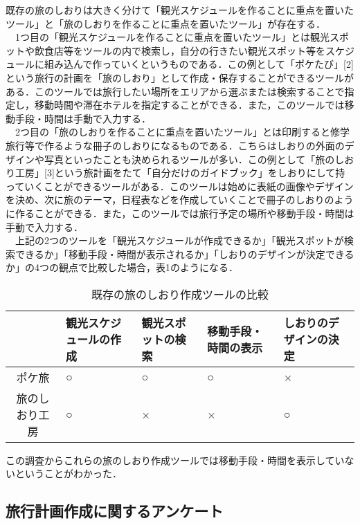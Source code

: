 \documentclass{funthesis}
\begin{document}
既存の旅のしおりは大きく分けて「観光スケジュールを作ることに重点を置いたツール」と「旅のしおりを作ることに重点を置いたツール」が存在する．\\
　1つ目の「観光スケジュールを作ることに重点を置いたツール」とは観光スポットや飲食店等をツールの内で検索し，自分の行きたい観光スポット等をスケジュールに組み込んで作っていくというものである．この例として「ポケたび」[2]という旅行の計画を「旅のしおり」として作成・保存することができるツールがある．このツールでは旅行したい場所をエリアから選ぶまたは検索することで指定し，移動時間や滞在ホテルを指定することができる．また，このツールでは移動手段・時間は手動で入力する．\\
　2つ目の「旅のしおりを作ることに重点を置いたツール」とは印刷すると修学旅行等で作るような冊子のしおりになるものである．こちらはしおりの外面のデザインや写真といったことも決められるツールが多い．この例として「旅のしおり工房」[3]という旅計画をたて「自分だけのガイドブック」をしおりにして持っていくことができるツールがある．このツールは始めに表紙の画像やデザインを決め、次に旅のテーマ，日程表などを作成していくことで冊子のしおりのように作ることができる．また，このツールでは旅行予定の場所や移動手段・時間は手動で入力する．\\
　上記の2つのツールを「観光スケジュールが作成できるか」「観光スポットが検索できるか」「移動手段・時間が表示されるか」「しおりのデザインが決定できるか」の4つの観点で比較した場合，表1のようになる．

\begin{table}[htb]
\begin{center}
\caption{既存の旅のしおり作成ツールの比較}
  \begin{tabular}{|c|p{1.3cm}|p{1.3cm}|p{1.3cm}|p{1.3cm}|} \hline
     & 観光スケジュールの作成 & 観光スポットの検索 & 移動手段・時間の表示 & しおりのデザインの決定 \\ \hline 
    ポケ旅 & ○ & ○ & ○ & × \\ \hline
    旅のしおり工房 & ○ & × & × & ○ \\ \hline
  \end{tabular}
  \end{center}
\end{table}


この調査からこれらの旅のしおり作成ツールでは移動手段・時間を表示していないということがわかった．\\



\subsection{旅行計画作成に関するアンケート}
\end{document}
